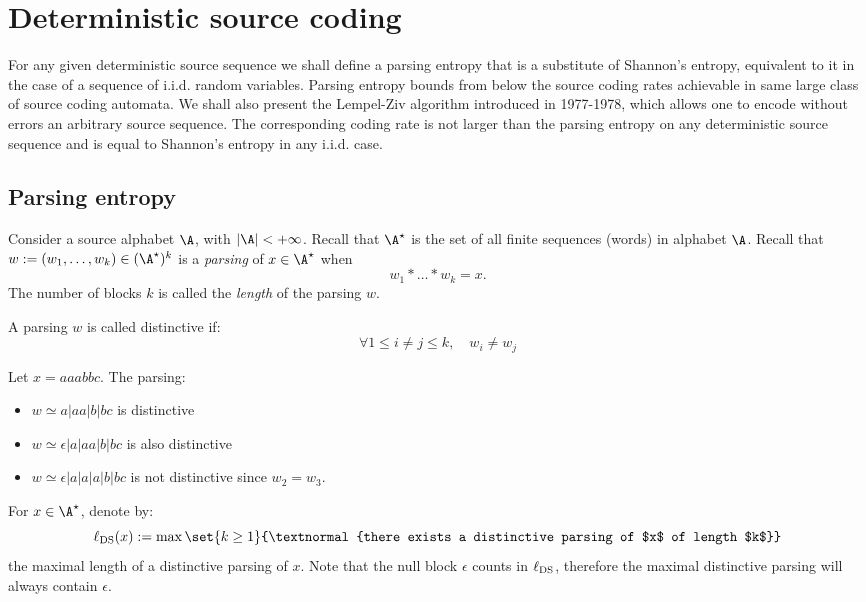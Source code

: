 \documentclass[toc, titlepaged]{../cs-classes/cs-classes}
\newcommand*{\lds}{\ell_{\textnormal{DS}}}
\begin{document}
\section{Deterministic source coding}
For any given deterministic source sequence we shall define a parsing entropy that is a substitute of Shannon's entropy, equivalent to it in the case of a sequence of i.i.d. random variables. Parsing entropy bounds from below the source coding rates achievable in same large class of source coding automata. We shall also present the Lempel-Ziv algorithm introduced in 1977-1978, which allows one to encode without errors an arbitrary source sequence. The corresponding coding rate is not larger than the parsing entropy on any deterministic source sequence and is equal to Shannon's entropy in any i.i.d. case.

\subsection{Parsing entropy}
Consider a source alphabet $\A$, with $|\A|<+\infty$. Recall that $\A^\star$ is the set of all finite sequences (words) in alphabet $\A$. Recall that $w:=(w_1, \dots, w_k)\in(\A^\star)^k$ is a \emph{parsing} of $x\in\A^\star$ when
\begin{equation*}
    w_1*\dots *w_k=x.
\end{equation*}
The number of blocks $k$ is called the \emph{length} of the parsing $w$.

\begin{definition}
    A parsing $w$ is called distinctive if:
    \begin{equation*}
        \forall 1\leq i\neq j\leq k, \quad w_i\neq w_j
    \end{equation*}
\end{definition}

\begin{example}
    Let $x=aaabbc$. The parsing:
    \begin{itemize}
        \item $w \simeq a|aa|b|bc$ is distinctive
        \item $w \simeq \epsilon|a|aa|b|bc$ is also distinctive
        \item $w \simeq \epsilon|a|a|a|b|bc$ is not distinctive since $w_2=w_3$.
    \end{itemize}
\end{example}

\begin{definition}
    For $x\in\A^\star$, denote by:
    \begin{equation*}
        \lds(x) := \max \set{k\geq 1}{\textnormal{there exists a distinctive parsing of $x$ of length $k$}}
    \end{equation*}
    the maximal length of a distinctive parsing of $x$. Note that the null block $\epsilon$ counts in $\lds$, therefore the maximal distinctive parsing will always contain $\epsilon$.
\end{definition}
\end{document}
